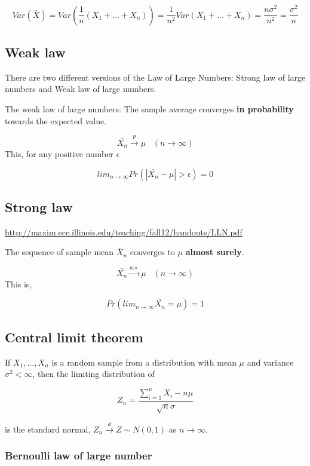 \documentclass[]{book}
\begin{document}
\[Var(\bar{X})=Var(\frac{1}{n}(X_1+...+X_n))=\frac{1}{n^2}Var(X_1+...+X_n)=\frac{n \sigma^2}{n^2}=\frac{\sigma^2}{n}\]

\hypertarget{weak-law}{%
\subsection{Weak law}\label{weak-law}}

There are two different versions of the Law of Large Numbers: Strong law of large numbers and Weak law of large numbers.

The weak law of large numbers: The sample average converges \textbf{in probability} towards the expected value.

\[\bar{X_n} \xrightarrow{p} \mu \; \; \; (n \rightarrow \infty)\]
This, for any positive number \(\epsilon\)

\[lim_{n \rightarrow \infty} Pr(|\bar{X_n}-\mu|>\epsilon)=0\]

\hypertarget{strong-law}{%
\subsection{Strong law}\label{strong-law}}

\url{http://maxim.ece.illinois.edu/teaching/fall12/handouts/LLN.pdf}

The sequence of sample mean \(\bar{X}_n\) converges to \(\mu\) \textbf{almost surely}.

\[\bar{X_n} \xrightarrow{a.s.} \mu \; \; \; (n \rightarrow \infty)\]
This is,

\[Pr(lim_{n \rightarrow \infty} \bar{X_n}=\mu)=1\]

\hypertarget{central-limit-theorem}{%
\subsection{Central limit theorem}\label{central-limit-theorem}}

If \(X_1,...,X_n\) is a random sample from a distribution with mean \(\mu\) and variance \(\sigma^2 < \infty\), then the limiting distribution of

\[Z_n=\frac{\sum_{i=1}^n X_i - n\mu}{\sqrt{n} \sigma}\]

is the standard normal, \(Z_n \xrightarrow{d} Z \sim N(0,1)\) as \(n \rightarrow \infty\).

\hypertarget{bernoulli-law-of-large-number}{%
\subsubsection{Bernoulli law of large number}\label{bernoulli-law-of-large-number}}
\end{document}
